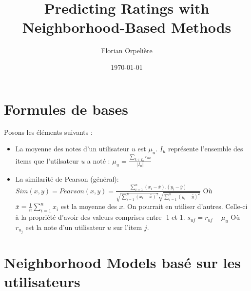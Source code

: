\documentclass[12pt]{article}
\title{Predicting Ratings with Neighborhood-Based
Methods}
\author{Florian Orpeli\`ere}
\date{\today}
\begin{document}
\maketitle

\section{Formules de bases}
\label{sec:explication}

Posons les \'el\'ements suivants : 

\begin{itemize}
\item La moyenne des notes d'un utilisateur $u$ est $\mu_u$. $I_u$ repr\'esente l'ensemble des items que l'utilsateur $u$ a not\'e :
\newline\newline
$\displaystyle \mu_u = \frac{\sum_{k \in I_u} r_{uk}}{\left| I_u \right|}$
\newline\newline
\item La similarité de Pearson (g\'en\'eral):
\newline\newline
$\displaystyle Sim(x,y)=Pearson(x,y)={\frac {\sum _{i=1}^{n}(x_{i}-{\bar {x}}).(y_{i}-{\bar {y}})}{{\sqrt {\sum _{i=1}^{n}(x_{i}-{\bar {x}})^{2}}}{\sqrt {\sum _{i=1}^{n}(y_{i}-{\bar {y}})^{2}}}}}$
\newline\newline\newline
O\`u ${\bar {x}}={\frac {1}{n}}\sum _{i=1}^{n}x_{i}$ est la moyenne des $x$.
\newline
On pourrait en utiliser d'autres. Celle-ci à la propriété d'avoir des valeurs comprises entre -1 et 1.
\newline\newline
$\displaystyle s_{uj} = r_{uj} - \mu_u$
\newline\newline
O\`u $r_{u_j}$ est la note d'un utilisateur $u$ sur l'item $j$.
\end{itemize}

\section{Neighborhood Models bas\'e sur les utilisateurs}
\end{document}
